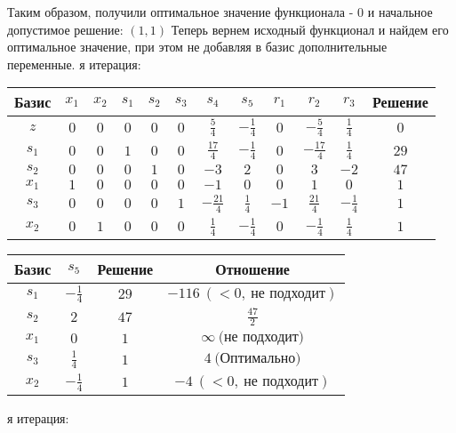 \documentclass{article}%
\begin{document}
\begin{flushleft}
\newline%
Таким образом, получили оптимальное значение функционала {-} 0 и начальное допустимое решение: %
$(1, 1)$%
\newline%
Теперь вернем исходный функционал и найдем его оптимальное значение, при этом не добавляя в базис дополнительные переменные.%
я итерация: %
\newline%
\newline%
\renewcommand{\arraystretch}{1.3}%
\begin{tabular}{|c|cccccccccc|c|}%
\hline%
Базис&$x_{1}$&$x_{2}$&$s_{1}$&$s_{2}$&$s_{3}$&$s_{4}$&$s_{5}$&$r_{1}$&$r_{2}$&$r_{3}$&Решение\\%
\hline%
$z$&$0$&$0$&$0$&$0$&$0$&$\frac{5}{4}$&$-\frac{1}{4}$&$0$&$-\frac{5}{4}$&$\frac{1}{4}$&$0$\\%
\hline%
$s_{1}$&$0$&$0$&$1$&$0$&$0$&$\frac{17}{4}$&$-\frac{1}{4}$&$0$&$-\frac{17}{4}$&$\frac{1}{4}$&$29$\\%
$s_{2}$&$0$&$0$&$0$&$1$&$0$&$-3$&$2$&$0$&$3$&$-2$&$47$\\%
$x_{1}$&$1$&$0$&$0$&$0$&$0$&$-1$&$0$&$0$&$1$&$0$&$1$\\%
$s_{3}$&$0$&$0$&$0$&$0$&$1$&$-\frac{21}{4}$&$\frac{1}{4}$&$-1$&$\frac{21}{4}$&$-\frac{1}{4}$&$1$\\%
$x_{2}$&$0$&$1$&$0$&$0$&$0$&$\frac{1}{4}$&$-\frac{1}{4}$&$0$&$-\frac{1}{4}$&$\frac{1}{4}$&$1$\\%
\hline%
\end{tabular}%
\newline%
\newline%
\newline%
\begin{tabular}{|cccc|}%
\hline%
Базис&$s_{5}$&Решение&Отношение\\%
\hline%
$s_{1}$&$-\frac{1}{4}$&$29$&$-116\: (< 0, \: \text{не подходит})$\\%
$s_{2}$&$2$&$47$&$\frac{47}{2}$\\%
$x_{1}$&$0$&$1$&$\infty \: \text{(не подходит)}$\\%
$s_{3}$&$\frac{1}{4}$&$1$&$4\: \text{(Оптимально)}$\\%
$x_{2}$&$-\frac{1}{4}$&$1$&$-4\: (< 0, \: \text{не подходит})$\\%
\hline%
\end{tabular}%
\newline%
\newline%
я итерация: %
\newline%

\end{flushleft}
\end{document}
